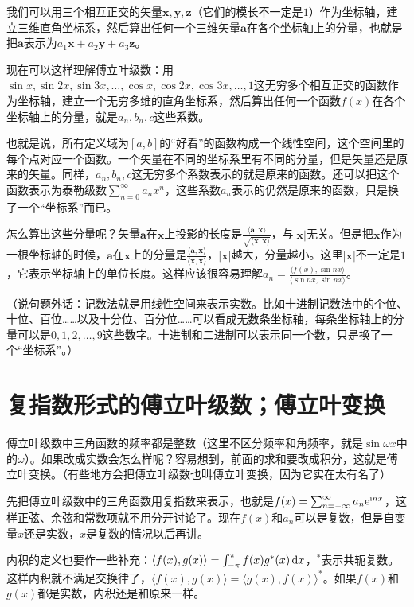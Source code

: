 我们可以用三个相互正交的矢量$\mathbf{x},\mathbf{y},\mathbf{z}$（它们的模长不一定是$1$）作为坐标轴，建立三维直角坐标系，然后算出任何一个三维矢量$\mathbf{a}$在各个坐标轴上的分量，也就是把$\mathbf{a}$表示为$a_1 \mathbf{x}+a_2 \mathbf{y}+a_3 \mathbf{z}$。

现在可以这样理解傅立叶级数：用$\sin x,\sin 2 x,\sin 3 x,\dots,\cos x,\cos 2 x,\cos 3 x,\dots,1$这无穷多个相互正交的函数作为坐标轴，建立一个无穷多维的直角坐标系，然后算出任何一个函数$f(x)$在各个坐标轴上的分量，就是$a_n,b_n,c$这些系数。

也就是说，所有定义域为$[a,b]$的“好看”的函数构成一个线性空间，这个空间里的每个点对应一个函数。一个矢量在不同的坐标系里有不同的分量，但是矢量还是原来的矢量。同样，$a_n,b_n,c$这无穷多个系数表示的就是原来的函数。还可以把这个函数表示为泰勒级数$\sum_{n=0}^{\infty} a_n x^n$，这些系数$a_n$表示的仍然是原来的函数，只是换了一个“坐标系”而已。

怎么算出这些分量呢？矢量$\mathbf{a}$在$\mathbf{x}$上投影的长度是$\frac{\langle \mathbf{a},\mathbf{x} \rangle}{\sqrt{\langle \mathbf{x},\mathbf{x} \rangle}}$，与$|\mathbf{x}|$无关。但是把$\mathbf{x}$作为一根坐标轴的时候，$\mathbf{a}$在$\mathbf{x}$上的分量是$\frac{\langle \mathbf{a},\mathbf{x} \rangle}{\langle \mathbf{x},\mathbf{x} \rangle}$，$|\mathbf{x}|$越大，分量越小。这里$|\mathbf{x}|$不一定是$1$，它表示坐标轴上的单位长度。这样应该很容易理解$a_n=\frac{\langle f(x),\sin n x \rangle}{\langle \sin n x,\sin n x \rangle}$。

（说句题外话：记数法就是用线性空间来表示实数。比如十进制记数法中的个位、十位、百位……以及十分位、百分位……可以看成无数条坐标轴，每条坐标轴上的分量可以是$0,1,2,\dots,9$这些数字。十进制和二进制可以表示同一个数，只是换了一个“坐标系”。）
\section{复指数形式的傅立叶级数；傅立叶变换}
傅立叶级数中三角函数的频率都是整数（这里不区分频率和角频率，就是$\sin \omega x$中的$\omega$）。如果改成实数会怎么样呢？容易想到，前面的求和要改成积分，这就是傅立叶变换。（有些地方会把傅立叶级数也叫傅立叶变换，因为它实在太有名了）

先把傅立叶级数中的三角函数用复指数来表示，也就是$f(x)=\sum_{n=-\infty}^{\infty} a_n \mathrm{e}^{\mathrm{i} n x}$，这样正弦、余弦和常数项就不用分开讨论了。现在$f(x)$和$a_n$可以是复数，但是自变量$x$还是实数，$x$是复数的情况以后再讲。

内积的定义也要作一些补充：$\langle f(x),g(x) \rangle=\int_{-\pi}^{\pi} f(x) g^*(x) \mathop{}\!\mathrm{d} x$，${}^*$表示共轭复数。这样内积就不满足交换律了，$\langle f(x),g(x) \rangle=\langle g(x),f(x) \rangle^*$。如果$f(x)$和$g(x)$都是实数，内积还是和原来一样。

